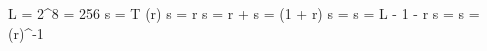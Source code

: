L = 2^8 = 256
s = T (r)
s =  \times r
s = r + 
s =  \times \log(1 + r)
s = 
s = L - 1 - r
s = 
s = \exp(r)^-1
